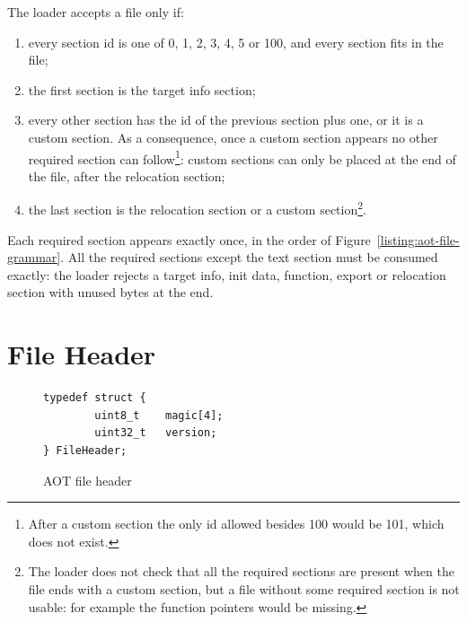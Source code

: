 \documentclass{article}
\begin{document}
The loader accepts a file only if:
\begin{enumerate}
    \item every section id is one of 0, 1, 2, 3, 4, 5 or 100, and every section fits in the file;
    \item the first section is the target info section;
    \item every other section has the id of the previous section plus one, or it is a custom section.
        As a consequence, once a custom section appears no other required section can follow\footnote{After a custom section the only id allowed besides 100 would be 101, which does not exist.}: custom sections can only be placed at the end of the file, after the relocation section;
    \item the last section is the relocation section or a custom section\footnote{The loader does not check that all the required sections are present when the file ends with a custom section, but a file without some required section is not usable: for example the function pointers would be missing.}.
\end{enumerate}
Each required section appears exactly once, in the order of Figure~\ref{listing:aot-file-grammar}.
All the required sections except the text section must be consumed exactly: the loader rejects a target info, init data, function, export or relocation section with unused bytes at the end.

\section{File Header}

\begin{figure}[H]
\begin{verbatim}
typedef struct {
        uint8_t    magic[4];
        uint32_t   version;
} FileHeader;
\end{verbatim}
\caption{AOT file header}
\label{fig:file-header}
\end{figure}
\end{document}
